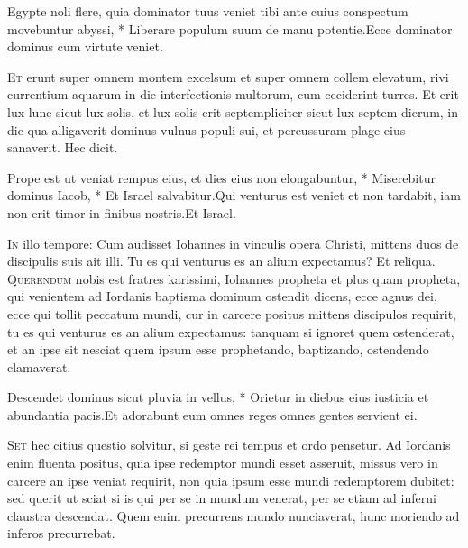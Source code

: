 \begin{multicols*}{2}
\begin{responsory}
{Egypte noli flere, quia dominator tuus veniet tibi ante cuius conspectum movebuntur abyssi, * Liberare populum suum de manu potentie.}{Ecce dominator dominus cum virtute veniet.}
\end{responsory}
\lettrine[lines=2]{\zallmancaps \color{Red} E}{t} erunt super omnem montem excelsum et super omnem collem elevatum, rivi currentium aquarum in die interfectionis multorum, cum ceciderint turres. Et erit lux lune sicut lux solis, et lux solis erit septempliciter sicut lux septem dierum, in die qua alligaverit dominus vulnus populi sui, et percussuram plage eius sanaverit. Hec dicit.
\begin{responsory-final}
{Prope est ut veniat rempus eius, et dies eius non elongabuntur, * Miserebitur dominus Iacob, * Et Israel salvabitur.}{Qui venturus est veniet et non tardabit, iam non erit timor in finibus nostris.}{Et Israel.}
\end{responsory-final}
\lettrine[lines=2]{\zallmancaps \color{Blue} I}{n} illo tempore: Cum audisset Iohannes in vinculis opera Christi, mittens duos de discipulis suis ait illi. Tu es qui venturus es an alium expectamus? Et reliqua.
\lettrine[lines=2]{\zallmancaps \color{Red} Q}{uerendum} nobis est fratres karissimi, Iohannes propheta et plus quam propheta, qui venientem ad Iordanis baptisma dominum ostendit dicens, ecce agnus dei, ecce qui tollit peccatum mundi, cur in carcere positus mittens discipulos requirit, tu es qui venturus es an alium expectamus: tanquam si ignoret quem ostenderat, et an ipse sit nesciat quem ipsum esse prophetando, baptizando, ostendendo clamaverat.
\begin{responsory}
{Descendet dominus sicut pluvia in vellus, * Orietur in diebus eius iusticia et abundantia pacis.}{Et adorabunt eum omnes reges omnes gentes servient ei.}
\end{responsory}
\lettrine[lines=2]{\zallmancaps \color{Blue} S}{et} hec citius questio solvitur, si geste rei tempus et ordo pensetur. Ad Iordanis enim fluenta positus, quia ipse redemptor mundi esset asseruit, missus vero in carcere an ipse veniat requirit, non quia ipsum esse mundi redemptorem dubitet: sed querit ut sciat si is qui per se in mundum venerat, per se etiam ad inferni claustra descendat. Quem enim precurrens mundo nunciaverat, hunc moriendo ad inferos precurrebat.

\end{multicols*}
